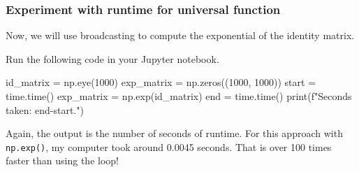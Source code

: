 \documentclass{beamer}
\newenvironment{codeblock}
    {\hfill\begin{beamerboxesrounded}[lower=codecol, width=0.8\textwidth]
    \medskip

    }
    { 
    \end{beamerboxesrounded}\hfill
    }
\theoremstyle{example}
\newcommand{\ct}[1]{\lstinline[language=Python,basicstyle=\ttfamily\footnotesize,stringstyle=\small\color{strings}]!#1!}
\begin{document}
\begin{frame}[fragile]
\frametitle{Experiment with runtime for universal function}
Now, we will use broadcasting to compute the exponential of the identity matrix.

\pause
Run the following code in your Jupyter notebook.

\begin{codeblock}

\begin{python}
id_matrix = np.eye(1000)
exp_matrix = np.zeros((1000, 1000))
start = time.time()
exp_matrix = np.exp(id_matrix)
end = time.time()
print(f"Seconds taken: {end-start}.")
\end{python}

\end{codeblock}

\vspace*{12pt}
\pause
Again, the output is the number of seconds of runtime. For this approach with \ct{np.exp()}, my computer took around 0.0045 seconds. That is over 100 times faster than using the loop!
\end{frame}
\end{document}
